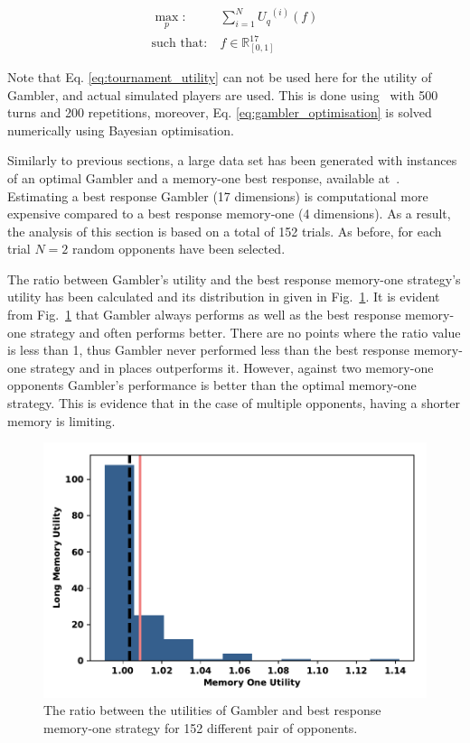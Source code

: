 \documentclass[10pt]{article}
\newcommand{\R}{\mathbb{R}}
\begin{document}
\begin{equation}\label{eq:gambler_optimisation}
    \begin{aligned}
    \max_p: & \ \sum_{i=1} ^ {N} {U_q}^{(i)} (f)
    \\
    \text{such that}: & \ f \in \R_{[0, 1]}^{17}
    \end{aligned}
\end{equation}

Note that Eq. \ref{eq:tournament_utility} can not be used here for the utility
of Gambler, and actual simulated players are used. This is done using~\cite{axelrodproject}
with 500 turns and 200 repetitions, moreover, Eq. \ref{eq:gambler_optimisation}
is solved numerically using Bayesian optimisation.

Similarly to previous sections, a large data set has been generated with
instances of an optimal Gambler and a memory-one best response, available
at~\cite{glynatsi2019}. Estimating a best response Gambler (17 dimensions) is
computational more expensive compared to a best response memory-one (4
dimensions). As a result, the analysis of this section is based on a total of
152 trials. As before, for each trial \(N=2\) random opponents have been selected.

The ratio between Gambler's utility and the best response memory-one strategy's utility has been calculated and its distribution in
given in Fig.~\ref{fig:utilities_gambler_mem_one}.
It is evident from Fig.~\ref{fig:utilities_gambler_mem_one} that
Gambler always performs as well as the best response memory-one strategy and often performs better. There are
no points where the ratio value is less than 1, thus Gambler never performed less
than the best response memory-one strategy and in places outperforms it.
However, against two memory-one opponents Gambler's performance is better than
the optimal memory-one strategy. This is evidence that in the case of multiple
opponents, having a
shorter memory is limiting.

\begin{figure}[!htbp]
    \centering
    \includegraphics[width=.5\textwidth]{img/gambler_performance_against_mem_one.pdf}
    \caption{The ratio between the utilities of Gambler and best response memory-one
    strategy for 152 different pair of opponents.}\label{fig:utilities_gambler_mem_one}
\end{figure}
\end{document}
